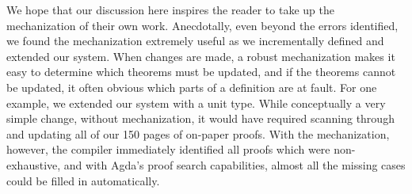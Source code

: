 We hope that our discussion here inspires the reader to take up the mechanization of their own work. Anecdotally, even beyond the errors identified, we found the mechanization extremely useful as we incrementally defined and extended our system. When changes are made, a robust mechanization makes it easy to determine which theorems must be updated, and if the theorems cannot be updated, it often obvious which parts of a definition are at fault. For one example, we extended our system with a unit type. While conceptually a very simple change, without mechanization, it would have required scanning through and updating all of our 150 pages of on-paper proofs. With the mechanization, however, the compiler immediately identified all proofs which were non-exhaustive, and with Agda's proof search capabilities, almost all the missing cases could be filled in automatically. 
